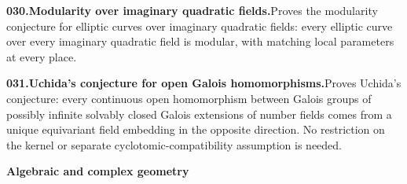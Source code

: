 \documentclass[11pt,a4paper]{article}
\begin{document}
  \par \begin{minipage}{\linewidth}
  \fontsize{10.5}{12.6}\selectfont\RaggedRight
  \hypertarget{result 030}{}
  {\bfseries\textcolor{muted}{030.}\enspace Modularity over imaginary quadratic fields.}\enspace Proves the modularity conjecture for elliptic curves over imaginary quadratic fields: every elliptic curve over every imaginary quadratic field is modular, with matching local parameters at every place.\par
  \end{minipage}\par\vspace{5pt}



  \par \begin{minipage}{\linewidth}
  \fontsize{10.5}{12.6}\selectfont\RaggedRight
  \hypertarget{result 031}{}
  {\bfseries\textcolor{muted}{031.}\enspace Uchida's conjecture for open Galois homomorphisms.}\enspace Proves Uchida's conjecture: every continuous open homomorphism between Galois groups of possibly infinite solvably closed Galois extensions of number fields comes from a unique equivariant field embedding in the opposite direction. No restriction on the kernel or separate cyclotomic-compatibility assumption is needed.\par
  \end{minipage}\par\vspace{5pt}



  \par{}\addvspace{12pt}
  \hypertarget{subject 3}{}\label{subject 3}
  {\fontsize{15}{18}\selectfont\bfseries Algebraic and complex geometry\par}
  \nobreak\vspace{9pt}\nobreak
\end{document}
